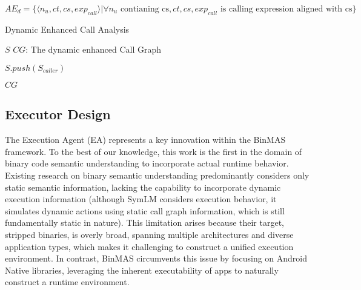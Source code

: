 \documentclass[acmsmall,screen,review,anonymous]{acmart} %
\begin{document}
$AE_d = \{ \langle n_u, ct, cs, exp_{call} \rangle | \forall n_u \text{ contianing cs}, ct, cs, exp_{call} \text{ is calling expression aligned with cs} \}$


\begin{algorithm}
  \caption{Dynamic Enhanced Call Analysis}
  \label{alg:CallAnalysis}
  \begin{algorithmic}[1]
    \REQUIRE $S$
    \ENSURE $CG$: The dynamic enhanced Call Graph

        \STATE $S.push(S_{caller})$
    \ENDFOR

    \ENDFOR
    \RETURN $CG$
  \end{algorithmic}
\end{algorithm}





\subsection{Executor Design}

The Execution Agent (EA) represents a key innovation within the BinMAS framework. To the best of our knowledge, this work is the first in the domain of binary code semantic understanding to incorporate actual runtime behavior. Existing research on binary semantic understanding predominantly considers only static semantic information, lacking the capability to incorporate dynamic execution information (although SymLM considers execution behavior, it simulates dynamic actions using static call graph information, which is still fundamentally static in nature). This limitation arises because their target, stripped binaries, is overly broad, spanning multiple architectures and diverse application types, which makes it challenging to construct a unified execution environment. In contrast, BinMAS circumvents this issue by focusing on Android Native libraries, leveraging the inherent executability of apps to naturally construct a runtime environment.
\end{document}

